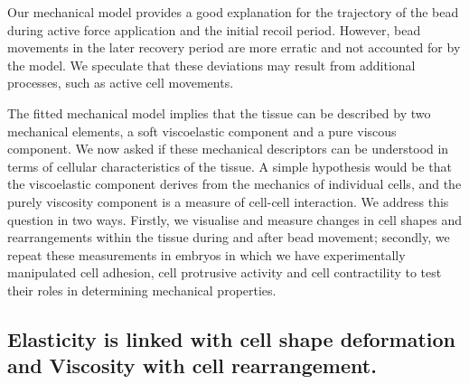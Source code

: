  Our mechanical model provides a good explanation for the trajectory of the bead during active force application and the initial recoil period.
 However, bead movements in the later recovery period are more erratic and not accounted for by the model.
 We speculate that these deviations may result from additional processes, such as active cell movements.

 The fitted mechanical model implies that the tissue can be described by two mechanical elements, a soft viscoelastic component and a pure viscous component.
 We now asked if these mechanical descriptors can be understood in terms of cellular characteristics of the tissue.
 A simple hypothesis would be that the viscoelastic component derives from the mechanics of individual cells, and the purely viscosity component is a measure of cell-cell interaction.
 We address this question in two ways.
 Firstly, we visualise and measure changes in cell shapes and rearrangements within the tissue during and after bead movement; secondly, we repeat these measurements in embryos in which we have experimentally manipulated cell adhesion, cell protrusive activity and cell contractility to test their roles in determining mechanical properties.

\subsection{Elasticity is linked with cell shape deformation and Viscosity with cell rearrangement.}


